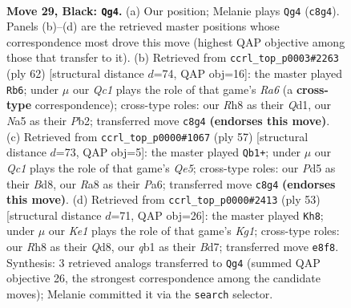 \documentclass[11pt]{article}
\begin{document}
\clearpage

\begin{figure}[p]\centering
\begin{subfigure}{0.46\textwidth}\centering
\resizebox{\linewidth}{!}{%
\newchessgame
\chessboard[
  setfen={r1q1k2r/p3b1pp/8/n2p4/p2P3P/4P1P1/1B1N2K1/1QR5 b - - 1 29},
  showmover=false,
  pgfstyle=straightmove, color=movearrow, markmove={c8-g4}
]}
\caption{}
\end{subfigure}\hfill
\begin{subfigure}{0.46\textwidth}\centering
\resizebox{\linewidth}{!}{%
\newchessgame
\chessboard[
  setfen={2q1r3/5p1k/R1n3b1/2p5/1pP1Pp1P/1N6/1P3PB1/3Q2K1 w - - 1 32},
  showmover=false,
  pgfstyle=straightmove, color=movearrow, markmove={a6-b6}
]}
\caption{}
\end{subfigure}
\\[4pt]
\begin{subfigure}{0.46\textwidth}\centering
\resizebox{\linewidth}{!}{%
\newchessgame
\chessboard[
  setfen={3br1k1/5pp1/p1Pp4/7p/3BqR2/2Q3P1/PP5P/6K1 b - - 3 29},
  showmover=false,
  pgfstyle=straightmove, color=movearrow, markmove={e4-b1}
]}
\caption{}
\end{subfigure}\hfill
\begin{subfigure}{0.46\textwidth}\centering
\resizebox{\linewidth}{!}{%
\newchessgame
\chessboard[
  setfen={3q2k1/3b2bp/p1rp2p1/3N4/1QB1P3/1P6/6PP/5R1K b - - 1 27},
  showmover=false,
  pgfstyle=straightmove, color=movearrow, markmove={g8-h8}
]}
\caption{}
\end{subfigure}
\caption{\textbf{Move 29, Black: \texttt{Qg4}.} (a) Our position; Melanie plays \texttt{Qg4} (\texttt{c8g4}). Panels (b)--(d) are the retrieved master positions whose correspondence most drove this move (highest QAP objective among those that transfer to it). (b) Retrieved from \texttt{ccrl\_top\_p0003\#2263} (ply 62) [structural distance $d$=74, QAP obj=16]: the master played \texttt{Rb6}; under $\mu$ our \emph{Qc1} plays the role of that game's \emph{Ra6} (a \textbf{cross-type} correspondence); cross-type roles: our \emph{R}h8 as their \emph{Q}d1, our \emph{N}a5 as their \emph{P}b2; transferred move \texttt{c8g4} \textbf{(endorses this move)}. (c) Retrieved from \texttt{ccrl\_top\_p0000\#1067} (ply 57) [structural distance $d$=73, QAP obj=5]: the master played \texttt{Qb1+}; under $\mu$ our \emph{Qc1} plays the role of that game's \emph{Qe5}; cross-type roles: our \emph{P}d5 as their \emph{B}d8, our \emph{R}a8 as their \emph{P}a6; transferred move \texttt{c8g4} \textbf{(endorses this move)}. (d) Retrieved from \texttt{ccrl\_top\_p0000\#2413} (ply 53) [structural distance $d$=71, QAP obj=26]: the master played \texttt{Kh8}; under $\mu$ our \emph{Ke1} plays the role of that game's \emph{Kg1}; cross-type roles: our \emph{R}h8 as their \emph{Q}d8, our \emph{q}b1 as their \emph{B}d7; transferred move \texttt{e8f8}. Synthesis: 3 retrieved analogs transferred to \texttt{Qg4} (summed QAP objective 26, the strongest correspondence among the candidate moves); Melanie committed it via the \texttt{search} selector.}
\label{fig:thought-m57}
\end{figure}
\end{document}
